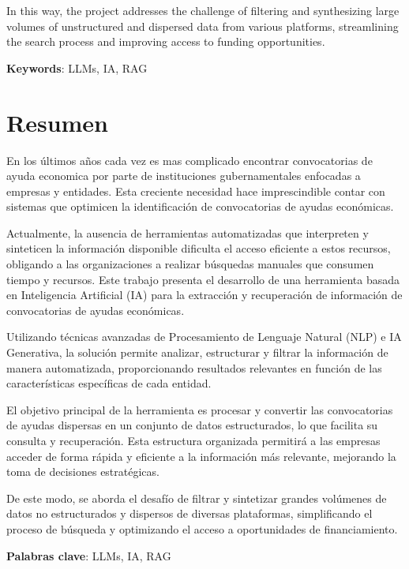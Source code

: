 In this way, the project addresses the challenge of filtering and synthesizing large volumes of unstructured and dispersed data from various platforms, streamlining the search process and improving access to funding opportunities.

\vspace{1.5cm}

\textbf{Keywords}: LLMs, IA, RAG

\chapter*{Resumen}

\onehalfspacing

En los últimos años cada vez es mas complicado encontrar convocatorias de ayuda economica por parte de instituciones gubernamentales enfocadas a empresas y entidades. Esta creciente necesidad hace imprescindible contar con sistemas que optimicen la identificación de convocatorias de ayudas económicas. 

Actualmente, la ausencia de herramientas automatizadas que interpreten y sinteticen la información disponible dificulta el acceso eficiente a estos recursos, obligando a las organizaciones a realizar búsquedas manuales que consumen tiempo y recursos.
Este trabajo presenta el desarrollo de una herramienta basada en Inteligencia Artificial (IA) para la extracción y recuperación de información de convocatorias de ayudas económicas.

Utilizando técnicas avanzadas de Procesamiento de Lenguaje Natural (NLP) e IA Generativa, la solución permite analizar, estructurar y filtrar la información de manera automatizada, proporcionando resultados relevantes en función de las características específicas de cada entidad.

El objetivo principal de la herramienta es procesar y convertir las convocatorias de ayudas dispersas en un conjunto de datos estructurados, lo que facilita su consulta y recuperación. Esta estructura organizada permitirá a las empresas acceder de forma rápida y eficiente a la información más relevante, mejorando la toma de decisiones estratégicas. 

De este modo, se aborda el desafío de filtrar y sintetizar grandes volúmenes de datos no estructurados y dispersos de diversas plataformas, simplificando el proceso de búsqueda y optimizando el acceso a oportunidades de financiamiento.

\vspace{1.5cm}

\textbf{Palabras clave}: LLMs, IA, RAG